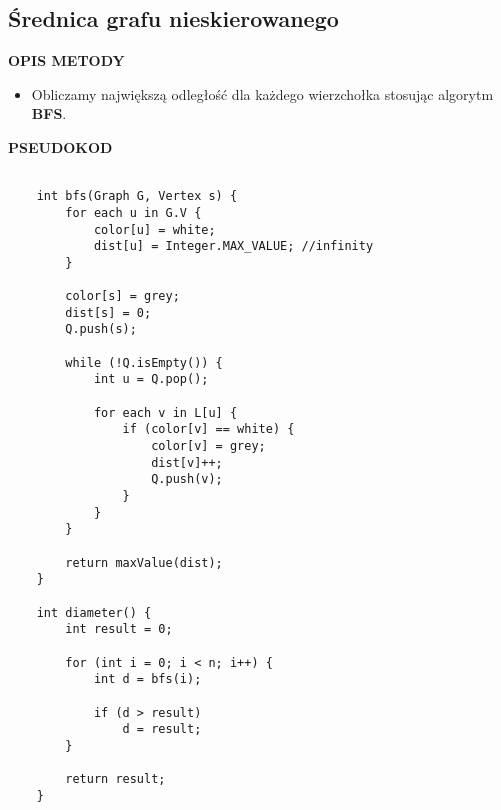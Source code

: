 \documentclass[algorytmy.tex]{subfiles}
\begin{document}
\pagebreak

\subsection{Średnica grafu nieskierowanego}
    \textbf{OPIS METODY}
    \begin{itemize}
        \item Obliczamy największą odległość dla każdego wierzchołka stosując
            algorytm \textbf{BFS}.
    \end{itemize}

    \textbf{PSEUDOKOD}
    \begin{verbatim}

    int bfs(Graph G, Vertex s) {
        for each u in G.V {
            color[u] = white;
            dist[u] = Integer.MAX_VALUE; //infinity
        }

        color[s] = grey;
        dist[s] = 0;
        Q.push(s);

        while (!Q.isEmpty()) {
            int u = Q.pop();

            for each v in L[u] {
                if (color[v] == white) {
                    color[v] = grey;
                    dist[v]++;
                    Q.push(v);
                }
            }
        }

        return maxValue(dist);
    }

    int diameter() {
        int result = 0;

        for (int i = 0; i < n; i++) {
            int d = bfs(i);

            if (d > result)
                d = result;
        }

        return result;
    }
    \end{verbatim}

\pagebreak
\end{document}
